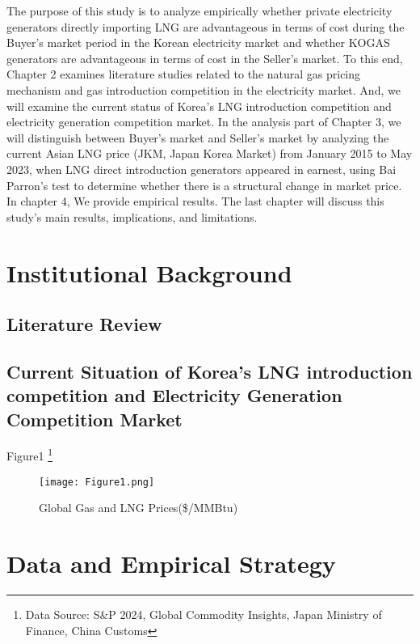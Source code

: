 \documentclass[leqno]{article}
\begin{document}
The purpose of this study is to analyze empirically whether private electricity generators directly importing LNG are advantageous in terms of cost during the Buyer's market period in the Korean electricity market and whether KOGAS generators are advantageous in terms of cost in the Seller's market. To this end, Chapter 2 examines literature studies related to the natural gas pricing mechanism and gas introduction competition in the electricity market. And, we will examine the current status of Korea's LNG introduction competition and electricity generation competition market. In the analysis part of Chapter 3, we will distinguish between Buyer's market and Seller's market by analyzing the current Asian LNG price (JKM, Japan Korea Market) from January 2015 to May 2023, when LNG direct introduction generators appeared in earnest, using Bai Parron's test to determine whether there is a structural change in market price. In chapter 4, We provide empirical results. The last chapter will discuss this study's main results, implications, and limitations.

\section{Institutional Background}

\subsection{Literature Review}



\subsection{Current Situation of Korea's LNG introduction competition and Electricity Generation Competition Market}


Figure1 \footnote{Data Source: S\&P 2024, Global Commodity Insights, Japan Ministry of Finance, China Customs}

\begin{figure}[htbp] 
    \centering
            \caption{Global Gas and LNG Prices(\$/MMBtu)}
        \texttt{[image: Figure1.png]}
        \label{fig:88mono}
\end{figure}




\section{Data and Empirical Strategy}
\end{document}
